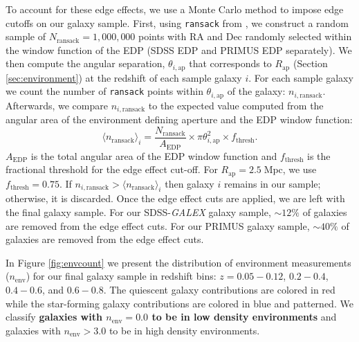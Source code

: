 \documentclass{emulateapj}
\def \apradius{2.5}
\begin{document}
To account for these edge effects, we use a Monte Carlo method to impose edge cutoffs on our galaxy sample. First, using \texttt{ransack} from \cite{Swanson:2008aa}, we construct a random sample of  $N_{\mathrm{ransack}} = 1,000,000$ points with RA and Dec randomly selected within the window function of the EDP (SDSS EDP and PRIMUS EDP separately). We then compute the angular separation, $\theta_{i, \mathrm{ap}}$ that corresponds to $R_{\mathrm{ap}}$ (Section \ref{sec:environment}) at the redshift of each sample galaxy $i$. For each sample galaxy we count the number of \texttt{ransack} points within $\theta_{i, \mathrm{ap}}$ of the galaxy: $n_{i,\mathrm{ransack}}$. Afterwards, we compare $n_{i,\mathrm{ransack}}$ to the expected value computed from the angular area of the environment defining aperture and the EDP window function: 
\begin{equation} \label{eq:ransack}
\langle n_{\mathrm{ransack}}\rangle_{i} = \frac{N_{\mathrm{ransack}}}{A_{\mathrm{EDP}}}\times {\pi \theta_{i, \mathrm{ap}}^2} \times f_{\mathrm{thresh}}. 
\end{equation} 
$A_{\mathrm{EDP}}$ is the total angular area of the EDP window function and $f_{\mathrm{thresh}}$ is the fractional threshold for the edge effect cut-off. For $R_{\mathrm{ap}}= \apradius \;\mathrm{Mpc}$, we use $f_{\mathrm{thresh}} = 0.75$. If $n_{i, \mathrm{ransack}} > \langle n_{\mathrm{ransack}} \rangle_i$ then galaxy $i$ remains in our sample; otherwise, it is discarded. Once the edge effect cuts are applied, we are left with the final galaxy sample. For our SDSS-{\em GALEX} galaxy sample, $\sim 12 \%$ of galaxies are removed from the edge effect cuts. For our PRIMUS galaxy sample, $\sim 40 \%$ of galaxies are removed from the edge effect cuts. 

In Figure \ref{fig:envcount} we present the distribution of environment measurements ($n_{\mathrm{env}}$) for our final galaxy sample in redshift bins: $z = 0.05 - 0.12$, $0.2 - 0.4$, $0.4-0.6$, and $0.6-0.8$. The quiescent galaxy contributions are colored in red while the star-forming galaxy contributions are colored in blue and patterned. We classify {\bf galaxies with $n_{\mathrm{env}} = 0.0$ to be in low density environments} and galaxies with $n_{\mathrm{env}} > 3.0$ to be in high density environments. 
\end{document}
